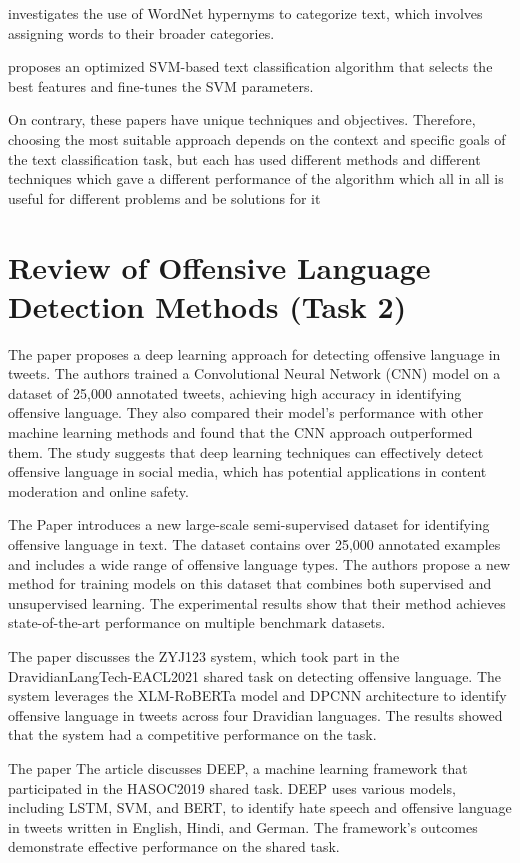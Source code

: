 \documentclass[11pt,a4paper]{article}
\begin{document}
\cite{4} investigates the use of WordNet hypernyms to categorize text, which involves assigning words to their broader categories.

\cite{5} proposes an optimized SVM-based text classification algorithm that selects the best features and fine-tunes the SVM parameters.

On contrary, these papers have unique techniques and objectives. Therefore, choosing the most suitable approach depends on the context and specific goals of the text classification task, but each has used different methods and different techniques which gave a different performance of the algorithm which all in all is useful for different problems and be solutions for it

\section{Review of Offensive Language Detection Methods (Task 2)}
The paper \cite{6}  proposes a deep learning approach for detecting offensive language in tweets. The authors trained a Convolutional Neural Network (CNN) model on a dataset of 25,000 annotated tweets, achieving high accuracy in identifying offensive language. They also compared their model's performance with other machine learning methods and found that the CNN approach outperformed them. The study suggests that deep learning techniques can effectively detect offensive language in social media, which has potential applications in content moderation and online safety.

The Paper \cite{7} introduces a new large-scale semi-supervised dataset for identifying offensive language in text. The dataset contains over 25,000 annotated examples and includes a wide range of offensive language types. The authors propose a new method for training models on this dataset that combines both supervised and unsupervised learning. The experimental results show that their method achieves state-of-the-art performance on multiple benchmark datasets. 

The paper \cite{8} discusses the ZYJ123 system, which took part in the DravidianLangTech-EACL2021 shared task on detecting offensive language. The system leverages the XLM-RoBERTa model and DPCNN architecture to identify offensive language in tweets across four Dravidian languages. The results showed that the system had a competitive performance on the task.

The paper \cite{9} The article discusses DEEP, a machine learning framework that participated in the HASOC2019 shared task. DEEP uses various models, including LSTM, SVM, and BERT, to identify hate speech and offensive language in tweets written in English, Hindi, and German. The framework's outcomes demonstrate effective performance on the shared task.
\end{document}
